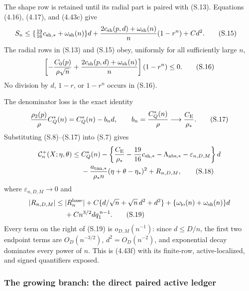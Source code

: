 \documentclass[11pt,a4paper]{article}
\numberwithin{equation}{section}
\theoremstyle{definition}
\theoremstyle{remark}
\newcommand{\CE}{C_{\mathrm E}}
\begin{document}
The shape row is retained until its radial part is paired with (S.13).
Equations (4.16), (4.17), and (4.43c) give
\begin{align}
 S_n\le{}&\{\tfrac{19}{16}c_{\rm sh,*}
                    +\omega_{\rm sh}(n)\}d
 +{2c_{\rm sh}(p,d)+\omega_{\rm sh}(n)\over n}(1-r^n)
 +Cd^2.                                                       \tag{S.15}
\end{align}
The radial rows in (S.13) and (S.15) obey, uniformly for all sufficiently
large \(n\),
\[
 \left[-{C_0(p)\over\rho\sqrt n}
       +{2c_{\rm sh}(p,d)+\omega_{\rm sh}(n)\over n}\right]
       (1-r^n)\le0.                                           \tag{S.16}
\]
No division by \(d\), \(1-r\), or \(1-r^n\) occurs in (S.16).

The denominator loss is the exact identity
\[
 {\rho_2(p)\over\rho}C_Q^*(n)
 =C_Q^*(n)-b_n d,\qquad b_n={C_Q^*(n)\over\rho}
       \longrightarrow{\CE\over\rho_*}.                      \tag{S.17}
\]
Substituting (S.8)--(S.17) into (S.7) gives
\begin{align}
 \mathcal C_n^+(X;\eta,\theta)
 \le{}&C_Q^*(n)
 -\left\{{\CE\over\rho_*}-{19\over16}c_{\rm sh,*}
                -\Lambda_{\rm abs,*}-\varepsilon_{n,D,M}\right\}d\notag\\
 &-{a_{\rm tan,*}\over\rho_*n}
       (\eta+\theta-\eta_*)^2+R_{n,D,M},                      \tag{S.18}
\end{align}
where \(\varepsilon_{n,D,M}\to0\) and
\begin{align}
 |R_{n,D,M}|\le{}&|R_n^{\rm base}|
 +C\{d/\sqrt n+\sqrt n\,d^2+d^2\}
 +\{\omega_{\rm lo}(n)+\omega_{\rm sh}(n)\}d\notag\\
 &+Cn^{3/2}dq_1^{\,n-1}.                                     \tag{S.19}
\end{align}
Every term on the right of (S.19) is \(o_{D,M}(n^{-1})\): since
\(d\le D/n\), the first two endpoint terms are \(O_D(n^{-3/2})\),
\(d^2=O_D(n^{-2})\), and exponential decay dominates every power of
\(n\).  This is (4.43f) with its finite-row, active-localized, and signed
quantifiers exposed.

\subsubsection*{The growing branch: the direct paired active ledger}
\end{document}
